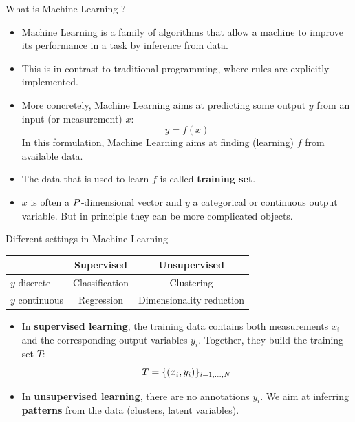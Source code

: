 \documentclass[xcolor=pdftex,dvipsnames,table]{beamer}
\begin{document}
\begin{frame}{What is Machine Learning ?}
\begin{itemize}
	\item Machine Learning is a family of algorithms that allow a machine to improve its performance in a task by inference from data. 
	\item This is in contrast to traditional programming, where rules are explicitly implemented. 
	\item More concretely, Machine Learning aims at predicting some output $y$ from an input (or measurement) $x$:
	\begin{equation}
	y = f(x)
	\end{equation}
	In this formulation, Machine Learning aims at finding (learning) $f$ from available data.
	\item The data that is used to learn $f$ is called \textbf{training set}.
	\item $x$ is often a $P$-dimensional vector and $y$ a categorical or continuous output variable. But in principle they can be more complicated objects.
\end{itemize}
\end{frame}

\begin{frame}{Different settings in Machine Learning}
	\begin{table}
	\begin{tabular}{|l || c | c | }
		\hline
 		& Supervised & Unsupervised \\
		\hline \hline
		$y$ discrete & Classification & Clustering \\
		$y$ continuous & Regression & Dimensionality reduction\\
		\hline
	\end{tabular}
	\end{table}
\begin{itemize}
	\item In \textbf{supervised learning}, the training data contains both measurements $x_i$ and the corresponding output variables $y_i$. Together, they build the training set $T$:
	\begin{equation}
	T = \{(x_i, y_i)\}_{i=1, \ldots, N}
	\end{equation}
	\item In \textbf{unsupervised learning}, there are no annotations $y_i$. We aim at inferring \textbf{patterns} from the data (clusters, latent variables).
\end{itemize}
\end{frame}
\end{document}
